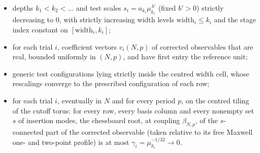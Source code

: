 \documentclass[
  letterpaper,
  11pt]{article}
\newcounter{none} %
\providecommand{\tightlist}{%
  \setlength{\itemsep}{0pt}\setlength{\parskip}{0pt}}
\begin{document}
\begin{itemize}
\tightlist
\item
  depths \(k_1<k_2<\dots\) and test scales
  \(s_i=a_{k_i}\mu_{k_i}^{\,b'}\) (fixed \(b'>0\)) strictly decreasing
  to \(0\), with strictly increasing width levels
  \(\mathrm{width}_i\le k_i\) and the stage index constant on
  \([\mathrm{width}_i,k_i]\);
\item
  for each trial \(i\), coefficient vectors \(v_i(N,p)\) of corrected
  observables that are real, bounded uniformly in \((N,p)\), and have
  first entry the reference unit;
\item
  generic test configurations lying strictly inside the centred width
  cell, whose rescalings converge to the prescribed configuration of
  each row;
\item
  for each trial \(i\), eventually in \(N\) and for every period \(p\),
  on the centred tiling of the cutoff torus: for every row, every basis
  column and every nonempty set \(s\) of insertion modes, the chessboard
  root, at coupling \(\beta_{N,p}\), of the \(s\)-connected part of the
  corrected observable (taken relative to its free Maxwell one- and
  two-point profile) is at most \(\gamma_i=\mu_{k_i}^{-1/32}\to0\).
\end{itemize}
\end{document}

